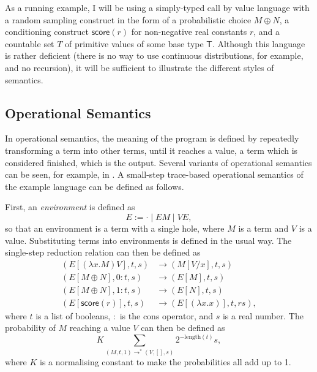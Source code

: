 \documentclass[titlepage]{article}
\newcommand{\tscore}{\mathsf{score}}
\begin{document}
As a running example, I will be using a simply-typed call by value language with a random sampling construct in the form of a probabilistic choice $M \oplus N$, a conditioning construct $\tscore(r)$ for non-negative real constants $r$, and a countable set $T$ of primitive values of some base type $\mathsf T$. Although this language is rather deficient (there is no way to use continuous distributions, for example, and no recursion), it will be sufficient to illustrate the different styles of semantics.

\subsection{Operational Semantics} \label{operational semantics}
In operational semantics, the meaning of the program is defined by repeatedly transforming a term into other terms, until it reaches a value, a term which is considered finished, which is the output. Several variants of operational semantics can be seen, for example, in \cite{borgstrom2016lambda}. A small-step trace-based operational semantics of the example language can be defined as follows.

First, an \emph{environment} is defined as
\begin{equation*}
E := \cdot \mid E M \mid V E,
\end{equation*}
so that an environment is a term with a single hole, where $M$ is a term and $V$ is a value. Substituting terms into environments is defined in the usual way. The single-step reduction relation can then be defined as
\begin{align*}
(E[(\lambda x. M) V], t, s) & \to (M[V/x], t, s) \\
(E[M \oplus N], 0:t, s) & \to (E[M], t, s) \\
(E[M \oplus N], 1:t, s) & \to (E[N], t, s) \\
(E[\tscore(r)], t, s) & \to (E[(\lambda x. x)], t, rs),
\end{align*}
where $t$ is a list of booleans, $:$ is the cons operator, and $s$ is a real number. The probability of $M$ reaching a value $V$ can then be defined as
\[
K \sum_{(M,t,1) \to^* (V,[],s)} 2^{-\mathrm{length}(t)} s,
\]
where $K$ is a normalising constant to make the probabilities all add up to 1.
\end{document}
